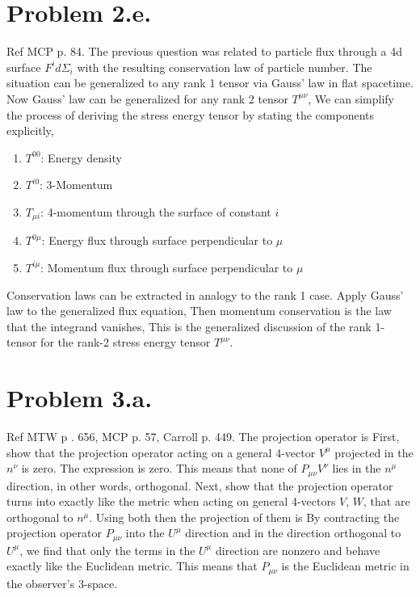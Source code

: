 \documentclass{article}
\begin{document}
\section*{Problem 2.e.}
Ref MCP p. 84. The previous question was related to particle flux through a 4d surface $F^i d\Sigma_i$ with the resulting conservation law of particle number. The situation can be generalized to any rank 1 tensor via Gauss' law in flat spacetime. Now Gauss' law can be generalized for any rank 2 tensor $T^{\mu \nu}$,
We can simplify the process of deriving the stress energy tensor by stating the components explicitly,
\begin{enumerate}
\item $T^{00}$: Energy density
\item $T^{i0}$: 3-Momentum
\item $T_{\mu i}$: 4-momentum through the surface of constant $i$
\item $T^{0\mu}$: Energy flux through surface perpendicular to $\mu$
\item $T^{i\mu}$: Momentum flux through surface perpendicular to $\mu$
\end{enumerate}
 Conservation laws can be extracted in analogy to the rank 1 case. Apply Gauss' law to the generalized flux equation,
Then momentum conservation is the law that the integrand vanishes,
This is the generalized discussion of the rank 1-tensor for the rank-2 stress energy tensor $T^{\mu\nu}$.
\section*{Problem 3.a.}
Ref MTW p . 656, MCP p. 57, Carroll p. 449. The projection operator is
First, show that the projection operator acting on a general 4-vector $V^\mu$ projected in the $n^\nu$ is zero.
The expression is zero. This means that none of $P_{\mu\nu} V^\nu$ lies in the $n^\mu$ direction, in other words, orthogonal. Next, show that the projection operator turns into exactly like the metric when acting on general 4-vectors $V$, $W$, that are orthogonal to $n^\mu$. Using both
then the projection of them is
By contracting the projection operator $P_{\mu \nu}$ into the $U^\mu$ direction and in the direction orthogonal to $U^\mu$, we find that only the terms in the $U^\mu$ direction are nonzero and behave exactly like the Euclidean metric. This means that $P_{\mu \nu}$ is the Euclidean metric in the observer's 3-space.
\end{document}
